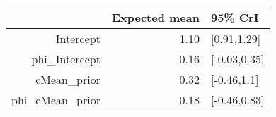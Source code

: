 \begin{tabular}{rrl}
  \hline
 & Expected mean & 95\% CrI \\ 
  \hline
Intercept & 1.10 & [0.91,1.29] \\ 
  phi\_Intercept & 0.16 & [-0.03,0.35] \\ 
  cMean\_prior & 0.32 & [-0.46,1.1] \\ 
  phi\_cMean\_prior & 0.18 & [-0.46,0.83] \\ 
   \hline
\end{tabular}

